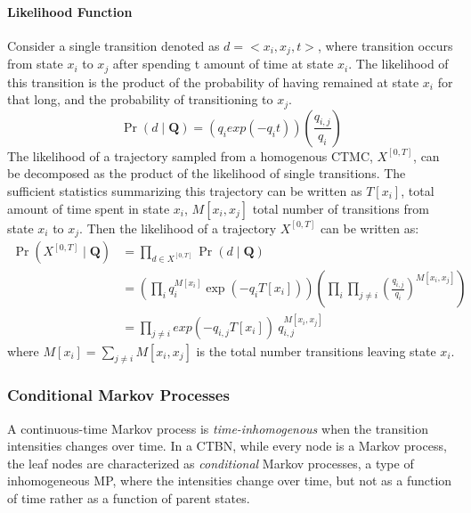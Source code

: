 \paragraph*{Likelihood Function}
\label{sec:llh_of_homo}
Consider a single transition denoted as $ d = <x_{i},x_{j},t> $, where transition occurs from state $ x_{i} $ to $ x_{j} $ after spending t amount of time at state $ x_{i} $. The likelihood of this transition is the product of the probability of having remained at state $ x_{i} $ for that long, and the probability of transitioning to $ x_{j} $.
\begin{equation}
\operatorname{Pr}(d  \mid \textbf{Q}) = \left( q_{i}exp(-q_{i}t) \right) \left( \frac{q_{i,j}}{q_{i}} \right)
\end{equation}
The likelihood of a trajectory sampled from a homogenous CTMC, $ X^{[0,T]} $, can be decomposed as the product of the likelihood of single transitions. The sufficient statistics summarizing this trajectory can be written as $ T[x_{i}] $, total amount of time spent in state $ x_{i} $, $ M[x_{i}, x_{j}] $ total number of transitions from state $ x_{i} $ to $ x_{j} $. Then the likelihood of a trajectory $  X^{\left[0,T\right] } $ can be written as:
\begin{align}
\operatorname{Pr}(X^{[0,T]}  \mid \textbf{Q}) &=  \prod_{d \in X^{[0,T]}} \operatorname{Pr}(d \mid \textbf{Q}) \nonumber\\&=\left(\prod_{ i} q_{i}^{M[x_{i}]} \exp \left(-q_{i} T[x_{i}]\right)\right)\left(\prod_{ i} \prod_{ j \neq i} \left(\frac{q_{i,j}}{q_{i}}\right)^{M\left[x_{i}, x_{j}\right]}\right) \nonumber\\ & = \prod_{j \neq i}  exp(-q_{i,j}T[x_{i}])\ q_{i,j}^{M[x_{i},x_{j}]}
\label{eq:lh_traj_homo}
\end{align}
where $ M[x_{i}] = \sum_{j \neq i} M[x_{i}, x_{j}] $ is the total number transitions leaving state $ x_{i} $.


\subsubsection{Conditional Markov Processes}
A continuous-time Markov process is \textit{time-inhomogenous} when the transition intensities changes over time. In a CTBN, while every node is a Markov process, the leaf nodes are characterized as \textit{conditional} Markov processes, a type of inhomogeneous MP, where the intensities change over time, but not as a function of time rather as a function of parent states. \cite{Nodelman1995} 

